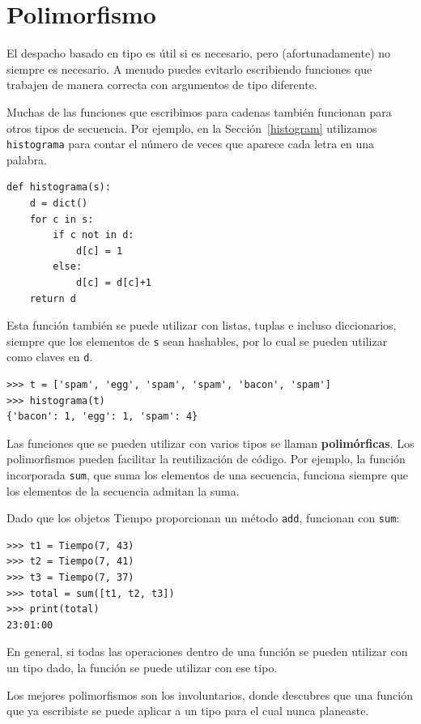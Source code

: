 \documentclass[10pt]{book}
\begin{document}
\section{Polimorfismo}
\label{polymorphism}

El despacho basado en tipo es útil si es necesario, pero (afortunadamente)
no siempre es necesario.  A menudo puedes evitarlo escribiendo funciones
que trabajen de manera correcta con argumentos de tipo diferente.

Muchas de las funciones que escribimos para cadenas también
funcionan para otros tipos de secuencia.
Por ejemplo, en la Sección~\ref{histogram}
utilizamos {\tt histograma} para contar el número de veces que aparece cada letra
en una palabra.

\begin{verbatim}
def histograma(s):
    d = dict()
    for c in s:
        if c not in d:
            d[c] = 1
        else:
            d[c] = d[c]+1
    return d
\end{verbatim}
%
Esta función también se puede utilizar con listas, tuplas e incluso diccionarios,
siempre que los elementos de {\tt s} sean hashables, por lo cual se pueden utilizar
como claves en {\tt d}.

\begin{verbatim}
>>> t = ['spam', 'egg', 'spam', 'spam', 'bacon', 'spam']
>>> histograma(t)
{'bacon': 1, 'egg': 1, 'spam': 4}
\end{verbatim}
%
Las funciones que se pueden utilizar con varios tipos se llaman {\bf polimórficas}.
Los polimorfismos pueden facilitar la reutilización de código.  Por ejemplo, la función
incorporada {\tt sum}, que suma los elementos de una secuencia, funciona
siempre que los elementos de la secuencia admitan la suma.

Dado que los objetos Tiempo proporcionan un método {\tt add}, funcionan
con {\tt sum}:

\begin{verbatim}
>>> t1 = Tiempo(7, 43)
>>> t2 = Tiempo(7, 41)
>>> t3 = Tiempo(7, 37)
>>> total = sum([t1, t2, t3])
>>> print(total)
23:01:00
\end{verbatim}
%
En general, si todas las operaciones dentro de una función
se pueden utilizar con un tipo dado, la función se puede utilizar con ese tipo.

Los mejores polimorfismos son los involuntarios, donde
descubres que una función que ya escribiste se puede
aplicar a un tipo para el cual nunca planeaste.
\end{document}
